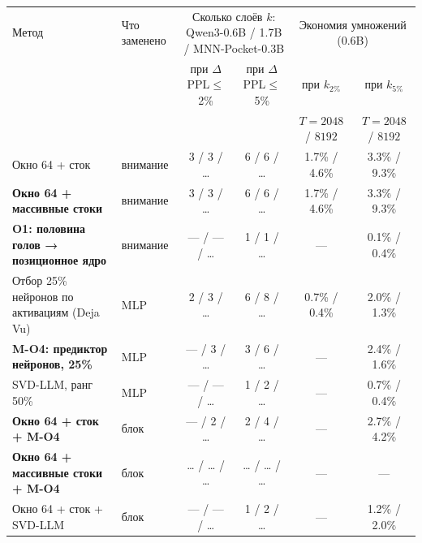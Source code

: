 \begin{tabular}{llcccc}
\toprule
Метод & Что заменено & \multicolumn{2}{c}{Сколько слоёв $k$: Qwen3-0.6B / 1.7B / MNN-Pocket-0.3B} & \multicolumn{2}{c}{Экономия умножений (0.6B)} \\
 & & при $\Delta$PPL$\le$2\% & при $\Delta$PPL$\le$5\% & при $k_{2\%}$ & при $k_{5\%}$ \\
 & & & & \scriptsize $T{=}2048$ / $8192$ & \scriptsize $T{=}2048$ / $8192$ \\
\midrule
Окно 64 + сток & внимание & 3 / 3 / … & 6 / 6 / … & 1.7\% / 4.6\% & 3.3\% / 9.3\% \\
\textbf{Окно 64 + массивные стоки} & внимание & 3 / 3 / … & 6 / 6 / … & 1.7\% / 4.6\% & 3.3\% / 9.3\% \\
\textbf{O1: половина голов → позиционное ядро} & внимание & — / — / … & 1 / 1 / … & — & 0.1\% / 0.4\% \\
Отбор 25\% нейронов по активациям (Deja Vu) & MLP & 2 / 3 / … & 6 / 8 / … & 0.7\% / 0.4\% & 2.0\% / 1.3\% \\
\textbf{M-O4: предиктор нейронов, 25\%} & MLP & — / 3 / … & 3 / 6 / … & — & 2.4\% / 1.6\% \\
SVD-LLM, ранг 50\% & MLP & — / — / … & 1 / 2 / … & — & 0.7\% / 0.4\% \\
\textbf{Окно 64 + сток + M-O4} & блок & — / 2 / … & 2 / 4 / … & — & 2.7\% / 4.2\% \\
\textbf{Окно 64 + массивные стоки + M-O4} & блок & … / … / … & … / … / … & — & — \\
Окно 64 + сток + SVD-LLM & блок & — / — / … & 1 / 2 / … & — & 1.2\% / 2.0\% \\
\bottomrule
\end{tabular}
